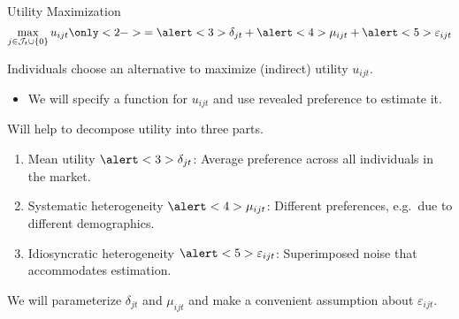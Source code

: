 \documentclass[aspectratio=169,t,11pt,table]{beamer}
\begin{document}
\begin{frame}{Utility Maximization}
    \vspace{-1.25\baselineskip}
    \begin{equation*}
        \max_{j \in \mathcal{J}_t \cup \{0\}} u_{ijt} \only<2->{= \alert<3>{\delta_{jt}} + \alert<4>{\mu_{ijt}} + \alert<5>{\varepsilon_{ijt}}}
    \end{equation*}
    \vspace{-0.5\baselineskip}
    \begin{wideitemize}
        \item Individuals choose an alternative to maximize (indirect) utility $u_{ijt}$.
        \begin{itemize}
            \item We will specify a function for $u_{ijt}$ and use revealed preference to estimate it.
        \end{itemize}
        \pause
        \item Will help to decompose utility into three parts.
        \pause
        \begin{enumerate}
            \item Mean utility $\alert<3>{\delta_{jt}}$: Average preference across all individuals in the market.
            \pause
            \item Systematic heterogeneity $\alert<4>{\mu_{ijt}}$: Different preferences, e.g.\ due to different demographics.
            \pause
            \item Idiosyncratic heterogeneity $\alert<5>{\varepsilon_{ijt}}$: Superimposed noise that accommodates estimation.
        \end{enumerate}
        \pause
        \item We will parameterize $\delta_{jt}$ and $\mu_{ijt}$ and make a convenient assumption about $\varepsilon_{ijt}$.
    \end{wideitemize}
\end{frame}
\end{document}
